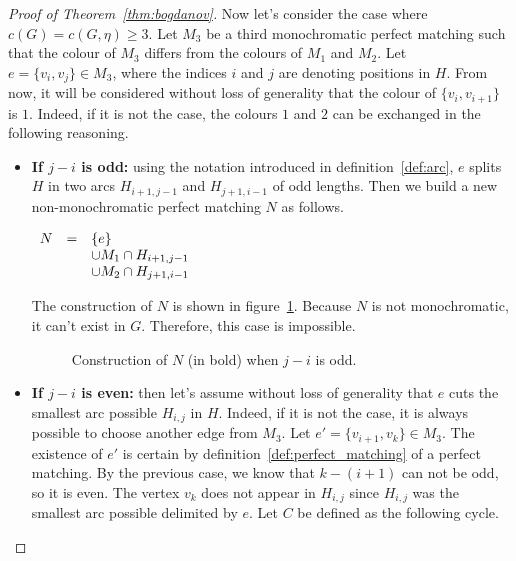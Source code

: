 \begin{proof}[Proof of Theorem~\ref{thm:bogdanov}]
    Now let's consider the case where $c(G) = c(G, \eta) \geq 3$.
    Let $M_3$ be a third monochromatic perfect matching such that the colour of $M_3$ differs from the colours of $M_1$ and $M_2$.
    Let $e = \{v_i, v_j\} \in M_3$, where the indices $i$ and $j$ are denoting positions in $H$.
    From now, it will be considered without loss of generality that the colour of $\{v_i, v_{i+1}\}$ is $1$.
    Indeed, if it is not the case, the colours $1$ and $2$ can be exchanged in the following reasoning.

    \begin{itemize}
        \item
            \textbf{If $j - i$ is odd:} using the notation introduced in definition~\ref{def:arc}, $e$ splits $H$ in two arcs $H_{i+1, j-1}$ and $H_{j+1, i-1}$ of odd lengths.
            Then we build a new non-monochromatic perfect matching $N$ as follows.
            
            \begin{center}
                $\begin{array}{r c l}
                    N & = & \{e\} \\
                      &   & \cup M_1 \cap H_{i+1, j-1} \\
                      &   & \cup M_2 \cap H_{j+1, i-1}
                \end{array}$
            \end{center}
            
            The construction of $N$ is shown in figure~\ref{fig:proof_simplified_odd}.
            Because $N$ is not monochromatic, it can't exist in $G$.
            Therefore, this case is impossible.
            
            \begin{figure}[H]
                \caption{Construction of $N$ (in bold) when $j - i$ is odd.}
                \label{fig:proof_simplified_odd}
            \end{figure}
            
        \item 
            \textbf{If $j - i$ is even:} then let's assume without loss of generality that $e$ cuts the smallest arc possible $H_{i, j}$ in $H$.
            Indeed, if it is not the case, it is always possible to choose another edge from $M_3$.
            Let $e' = \{v_{i + 1}, v_k\} \in M_3$.
            The existence of $e'$ is certain by definition~\ref{def:perfect_matching} of a perfect matching.
            By the previous case, we know that $k - (i + 1)$ can not be odd, so it is even.
            The vertex $v_k$ does not appear in $H_{i, j}$ since $H_{i, j}$ was the smallest arc possible delimited by $e$.
            Let $C$ be defined as the following cycle.
            

\end{itemize}
\end{proof}
